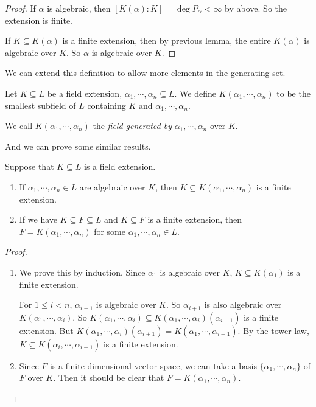 \documentclass[a4paper]{article}
\begin{document}
\begin{proof}
  If $\alpha$ is algebraic, then $[K(\alpha): K] = \deg P_\alpha < \infty$ by above. So the extension is finite.

  If $K\subseteq K(\alpha)$ is a finite extension, then by previous lemma, the entire $K(\alpha)$ is algebraic over $K$. So $\alpha$ is algebraic over $K$.
\end{proof}

We can extend this definition to allow more elements in the generating set.
\begin{defi}
  Let $K\subseteq L$ be a field extension, $\alpha_1, \cdots, \alpha_n\subseteq L$. We define $K(\alpha_1, \cdots, \alpha_n)$ to be the smallest subfield of $L$ containing $K$ and $\alpha_1, \cdots, \alpha_n$.

  We call $K(\alpha_1, \cdots, \alpha_n)$ the \emph{field generated by} $\alpha_1, \cdots, \alpha_n$ over $K$.
\end{defi}

And we can prove some similar results.

\begin{thm}[]
  Suppose that $K\subseteq L$ is a field extension.
  \begin{enumerate}
    \item If $\alpha_1, \cdots, \alpha_n \in L$ are algebraic over $K$, then $K\subseteq K(\alpha_1, \cdots, \alpha_n)$ is a finite extension.
    \item If we have $K\subseteq F\subseteq L$ and $K\subseteq F$ is a finite extension, then $F = K(\alpha_1, \cdots, \alpha_n)$ for some $\alpha_1,\cdots, \alpha_n \in L$.
  \end{enumerate}
\end{thm}

\begin{proof}\leavevmode
  \begin{enumerate}
    \item We prove this by induction. Since $\alpha_1$ is algebraic over $K$, $K\subseteq K(\alpha_1)$ is a finite extension.

      For $1 \leq i < n$, $\alpha_{i + 1}$ is algebraic over $K$. So $\alpha_{i + 1}$ is also algebraic over $K(\alpha_1, \cdots, \alpha_i)$. So $K(\alpha_1, \cdots, \alpha_i)\subseteq K(\alpha_1, \cdots, \alpha_i)(\alpha_{i + 1})$ is a finite extension. But $K(\alpha_1, \cdots, \alpha_i)(\alpha_{i + 1}) = K(\alpha_1, \cdots, \alpha_{i + 1})$. By the tower law, $K \subseteq K(\alpha_i, \cdots, \alpha_{i + 1})$ is a finite extension.

    \item Since $F$ is a finite dimensional vector space, we can take a basis $\{\alpha_1, \cdots, \alpha_n\}$ of $F$ over $K$. Then it should be clear that $F = K(\alpha_1, \cdots, \alpha_n)$.
  \end{enumerate}
\end{proof}
\end{document}

